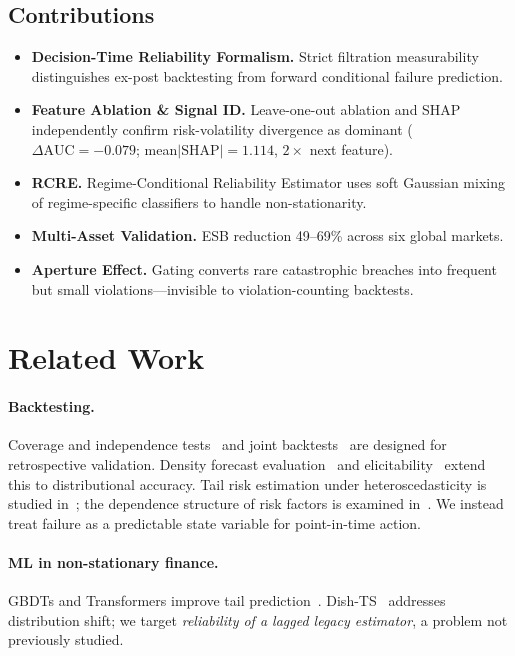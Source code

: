 \documentclass[sigconf, anonymous]{acmart}
\begin{document}
\subsection{Contributions}
\begin{itemize}[leftmargin=*,itemsep=1pt,topsep=2pt]
  \item \textbf{Decision-Time Reliability Formalism.} Strict filtration
    measurability distinguishes ex-post backtesting from forward
    conditional failure prediction.
  \item \textbf{Feature Ablation \& Signal ID.} Leave-one-out ablation
    and SHAP independently confirm risk-volatility divergence as dominant
    ($\Delta\text{AUC}{=}{-}0.079$; mean$|\text{SHAP}|{=}1.114$,
    $2\times$ next feature).
  \item \textbf{RCRE.} Regime-Conditional Reliability Estimator uses
    soft Gaussian mixing of regime-specific classifiers to handle
    non-stationarity.
  \item \textbf{Multi-Asset Validation.} ESB reduction 49--69\% across
    six global markets.
  \item \textbf{Aperture Effect.} Gating converts rare catastrophic
    breaches into frequent but small violations---invisible to
    violation-counting backtests.
\end{itemize}

\section{Related Work}

\paragraph{Backtesting.}
Coverage and independence tests~\cite{kupiec1995techniques,christoffersen1998evaluating} 
and joint backtests~\cite{gaglianone2022evaluating} are designed for retrospective 
validation. Density forecast evaluation~\cite{diebold1998evaluating} and 
elicitability~\cite{nolde2017elicitability} extend this to distributional accuracy. 
Tail risk estimation under heteroscedasticity is studied in~\cite{mcneil2000estimation}; 
the dependence structure of risk factors is examined in~\cite{embrechts2002correlation}. 
We instead treat failure as a predictable state variable for point-in-time action.

\paragraph{ML in non-stationary finance.}
GBDTs and Transformers improve tail prediction~\cite{arimond2020deep,
zeng2023transformers}. Dish-TS~\cite{fan2023dishts} addresses
distribution shift; we target \emph{reliability of a lagged legacy
estimator}, a problem not previously studied.
\end{document}
